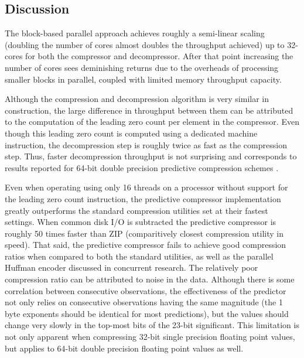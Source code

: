 \subsection{Discussion}
The block-based parallel approach achieves roughly a semi-linear scaling (doubling the number of cores almost doubles the throughput achieved) up to 32-cores for both the compressor and decompressor. 
After that point increasing the number of cores sees deminishing returns due to the overheads of processing smaller blocks in parallel, coupled with limited memory throughput capacity. 

Although the compression and decompression algorithm is very similar in construction, the large difference in throughput between them can be attributed to the computation of the 
leading zero count per element in the compressor. Even though this leading zero count is computed using a dedicated machine instruction, the decompression step is roughly 
twice as fast as the compression step. Thus, faster decompression throughput is not surprising and corresponds to results reported for 64-bit double precision predictive compression schemes 
\cite{4976448,O'Neil:2011:FDC:1964179.1964189}.

Even when operating using only 16 threads on a processor without support for the leading zero count instruction, the predictive compressor implementation greatly outperforms the 
standard compression utilities set at their fastest settings. When common disk I/O is subtracted the predictive compressor is roughly 50 times faster than ZIP (comparitively closest
compression utility in speed). That said, the predictive compressor fails to achieve good compression ratios when compared to both the standard utilities, as well as the parallel Huffman encoder 
discussed in concurrent research. The relatively poor compression ratio can be attributed to noise in the data. Although there is some correlation between consecutive observations, the effectiveness 
of the predictor not only relies on consecutive observations having the same magnitude (the 1 byte exponents should be identical for most predictions), but the values should change very 
slowly in the top-most bits of the 23-bit significant. This limitation is not only apparent when compressing 32-bit single precision floating point values, but applies to 64-bit double 
precision floating point values as well.

